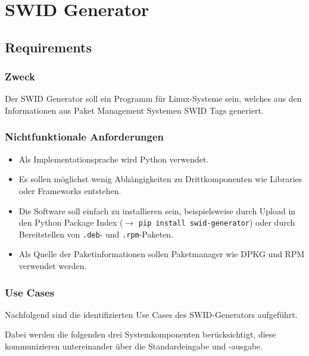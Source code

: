 \chapter{SWID Generator}


\section{Requirements}

\subsection{Zweck}

Der SWID Generator soll ein Programm für Linux-Systeme sein, welches aus den
Informationen aus Paket Management Systemen SWID Tags generiert.

\subsection{Nichtfunktionale Anforderungen}

\begin{itemize}
	\item Als Implementationsprache wird Python verwendet.
	\item Es sollen möglichst wenig Abhängigkeiten zu Drittkomponenten wie
		Libraries oder Frameworks entstehen.
	\item Die Software soll einfach zu installieren sein, beispielsweise durch
		Upload in den Python Package Index ($\rightarrow$ \texttt{pip install
		swid-generator}) oder durch Bereitstellen von \texttt{.deb}- und
		\texttt{.rpm}-Paketen.
	\item Als Quelle der Paketinformationen sollen Paketmanager wie DPKG und RPM
		verwendet werden.
\end{itemize}

\subsection{Use Cases}

Nachfolgend sind die identifizierten Use Cases des SWID-Generators aufgeführt.

Dabei werden die folgenden drei Systemkomponenten berücksichtigt, diese
kommunizieren untereinander über die Standardeingabe und -ausgabe.

\vspace{1em}

